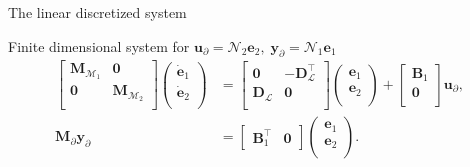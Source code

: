 \documentclass[aspectratio=169]{ISAE-Beamer}
\begin{document}
\begin{frame}{The linear discretized system}
\begin{exampleblock}{Finite dimensional system for $\bm{u}_\partial = \mathcal{N}_2 \displaystyle \bm{e}_2, \; \bm{y}_\partial = \mathcal{N}_1 \displaystyle \bm{e}_1$}
	\begin{equation*}
	\begin{aligned}
	\begin{bmatrix}
	\mathbf{M}_{\mathcal{M}_1} & \mathbf{0} \\
	\mathbf{0} & \mathbf{M}_{\mathcal{M}_2} \\
	\end{bmatrix}
	\begin{pmatrix}
	\dot{\mathbf{e}}_{1} \\
	\dot{\mathbf{e}}_{2} \\
	\end{pmatrix}
	&= \begin{bmatrix}
	\mathbf{0} & - \mathbf{D}_{\mathcal{L}}^\top \\
	\mathbf{D}_{\mathcal{L}} & \mathbf{0} \\
	\end{bmatrix} 
	\begin{pmatrix}
	\mathbf{e}_{1} \\
	\mathbf{e}_{2} \\
	\end{pmatrix} + 
	\begin{bmatrix}
	\mathbf{B}_1\\
	\mathbf{0}\\
	\end{bmatrix}
	\mathbf{u}_\partial, \\
	\mathbf{M}_\partial {\mathbf{y}_\partial} &= \begin{bmatrix}
	\mathbf{B}_1^\top & \mathbf{0}
	\end{bmatrix}\begin{pmatrix}
	\mathbf{e}_{1} \\
	\mathbf{e}_{2} \\
	\end{pmatrix}.
	\end{aligned}
	\end{equation*}
\end{exampleblock}


\end{frame}
\end{document}
